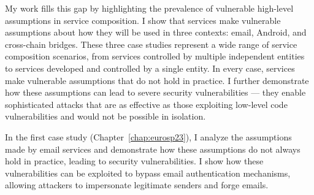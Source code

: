\begin{dissertationintroduction}


My work fills this gap by highlighting the prevalence of vulnerable high-level assumptions in service composition. I show that services make vulnerable assumptions about how they will be used in three contexts: email, Android, and cross-chain bridges. These three case studies represent a wide range of service composition scenarios, from services controlled by multiple independent entities to services developed and controlled by a single entity. In every case, services make vulnerable assumptions that do not hold in practice. I further demonstrate how these assumptions can lead to severe security vulnerabilities --- they enable sophisticated attacks that are as effective as those exploiting low-level code vulnerabilities and would not be possible in isolation. 





In the first case study (Chapter~\ref{chap:eurosp23}), I analyze the assumptions made by email services and demonstrate how these assumptions do not always hold in practice, leading to security vulnerabilities. I show how these vulnerabilities can be exploited to bypass email authentication mechanisms, allowing attackers to impersonate legitimate senders and forge emails.


\end{dissertationintroduction}
